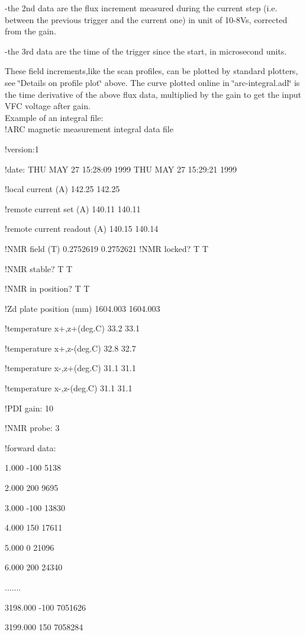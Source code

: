 -the 2nd data are the flux increment measured during the current step (i.e. between
the previous trigger and the current one) in unit of 10-8Vs, corrected from
the gain. 

-the 3rd data are the time of the trigger since the start, in microsecond units. 

These field increments,like the scan profiles, can be plotted by standard plotters,
see \char`\"{}Details on profile plot\char`\"{} above. The curve plotted online
in \char`\"{}arc-integral.adl\char`\"{} is the time derivative of the above
flux data, multiplied by the gain to get the input VFC voltage after gain.\\


Example of an integral file:\\


!ARC magnetic measurement integral data file 

!version:1 

!date: THU MAY 27 15:28:09 1999 THU MAY 27 15:29:21 1999 

!local current (A) 142.25 142.25 

!remote current set (A) 140.11 140.11 

!remote current readout (A) 140.15 140.14 

!NMR field (T) 0.2752619 0.2752621 !NMR locked? T T 

!NMR stable? T T 

!NMR in position? T T 

!Zd plate position (mm) 1604.003 1604.003 

!temperature x+,z+(deg.C) 33.2 33.1 

!temperature x+,z-(deg.C) 32.8 32.7 

!temperature x-,z+(deg.C) 31.1 31.1 

!temperature x-,z-(deg.C) 31.1 31.1 

!PDI gain: 10 

!NMR probe: 3 

!forward data: 

1.000 -100 5138 

2.000 200 9695 

3.000 -100 13830 

4.000 150 17611 

5.000 0 21096 

6.000 200 24340 

....... 

3198.000 -100 7051626 

3199.000 150 7058284 

